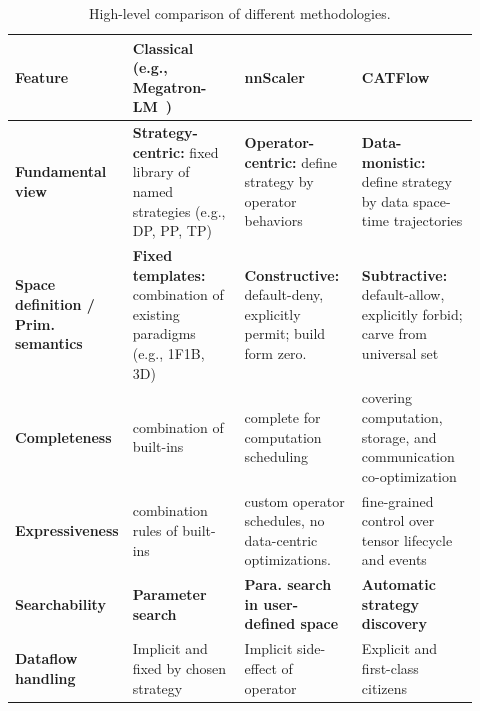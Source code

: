 \documentclass[letterpaper,twocolumn,10pt]{article}
\newcommand{\name}{CATFlow}
\begin{document}


\begin{table}[t!]
\small
\centering
\setlength{\tabcolsep}{4pt}
\caption{High-level comparison of different methodologies.}
\vspace{-0.5em}
\label{tab:landscape}
\begin{tabular}{p{0.14\linewidth}p{0.26\linewidth}p{0.26\linewidth}p{0.26\linewidth}}
\toprule
\textbf{Feature} & \textbf{Classical} (e.g., Megatron-LM~\cite{shoeybi2019megatron}) & \textbf{nnScaler~\cite{lin2024nnscaler}} & \textbf{\name{}} \\
\midrule
\textbf{Fundamental view} & \textbf{Strategy-centric:} fixed library of named strategies (e.g., DP, PP, TP) & \textbf{Operator-centric:} define strategy by operator behaviors & \textbf{Data-monistic:} define strategy by data space-time trajectories \\
\textbf{Space definition / Prim. semantics} & \textbf{Fixed templates:} combination of existing paradigms (e.g., 1F1B, 3D) & \textbf{Constructive:} default-deny, explicitly permit; build form zero. & \textbf{Subtractive:} default-allow, explicitly forbid; carve from universal set\\
\textbf{Completeness} & combination of built-ins &  complete for computation scheduling & covering computation, storage, and communication co-optimization \\
\textbf{Expressiveness} & combination rules of built-ins & custom operator schedules, no data-centric optimizations. & fine-grained control over tensor lifecycle and events \\
\textbf{Searchability} & \textbf{Parameter search} & \textbf{Para. search in user-defined space} & \textbf{Automatic strategy discovery} \\
\textbf{Dataflow handling} & Implicit and fixed by chosen strategy & Implicit side-effect of operator & Explicit and first-class citizens \\
\bottomrule
\end{tabular}
\vspace{-1em}
\end{table}
\end{document}
